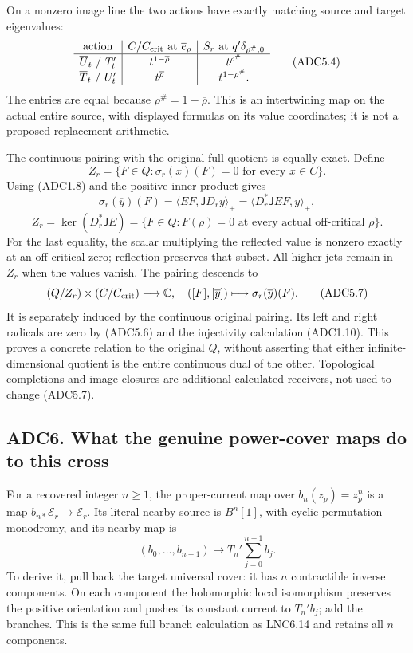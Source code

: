 On a nonzero image line the two actions have exactly matching source and
target eigenvalues: \[
\begin{array}{c|c|c}
\text{action}&C/C_{\rm crit}\text{ at }\overline e_\rho
&S_r\text{ at }q'\delta_{\rho^\#,0}\\ \hline
\overline U_t\text{ / }T_t'&t^{1-\overline\rho}&t^{\rho^\#}\\
\overline T_t\text{ / }U_t'&t^{\overline\rho}&t^{1-\rho^\#}.
\end{array}
\tag{ADC5.4}
\] The entries are equal because \(\rho^\#=1-\overline\rho\). This is an
intertwining map on the actual entire source, with displayed formulas on
its value coordinates; it is not a proposed replacement arithmetic.

The continuous pairing with the original full quotient is equally exact.
Define \[
Z_r=\{F\in Q:\sigma_r(x)(F)=0\text{ for every }x\in C\}.
\tag{ADC5.5}
\] Using (ADC1.8) and the positive inner product gives \[
\sigma_r(\overline y)(F)
=\langle EF,\mathsf JD_ry\rangle_+
=\langle D_r^*\mathsf JEF,y\rangle_+,
\] \[
Z_r=\ker(D_r^*\mathsf JE)
=\{F\in Q:F(\rho)=0\text{ at every actual off-critical }\rho\}.
\tag{ADC5.6}
\] For the last equality, the scalar multiplying the reflected value is
nonzero exactly at an off-critical zero; reflection preserves that
subset. All higher jets remain in \(Z_r\) when the values vanish. The
pairing descends to \[
(Q/Z_r)\times(C/C_{\rm crit})\longrightarrow\mathbb C,\quad
([F],[\overline y])\longmapsto\sigma_r(\overline y)(F).
\tag{ADC5.7}
\] It is separately induced by the continuous original pairing. Its left
and right radicals are zero by (ADC5.6) and the injectivity calculation
(ADC1.10). This proves a concrete relation to the original \(Q\),
without asserting that either infinite-dimensional quotient is the
entire continuous dual of the other. Topological completions and image
closures are additional calculated receivers, not used to change
(ADC5.7).

\subsection{ADC6. What the genuine power-cover maps do to this
cross}\label{adc6.-what-the-genuine-power-cover-maps-do-to-this-cross}

For a recovered integer \(n\geq1\), the proper-current map over
\(b_n(z_p)=z_p^n\) is a map \(b_{n*}\mathscr E_r\to\mathscr E_r\). Its
literal nearby source is \(B^n[1]\), with cyclic permutation monodromy,
and its nearby map is \[
(b_0,\ldots,b_{n-1})\longmapsto T_n'\sum_{j=0}^{n-1}b_j.
\tag{ADC6.1}
\] To derive it, pull back the target universal cover: it has \(n\)
contractible inverse components. On each component the holomorphic local
isomorphism preserves the positive orientation and pushes its constant
current to \(T_n'b_j\); add the branches. This is the same full branch
calculation as LNC6.14 and retains all \(n\) components.

